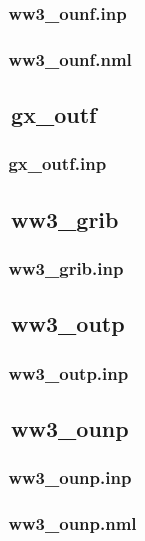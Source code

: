 \subsubsection{~ww3\_ounf.inp} \label{sec:config131}
\vsssub
\vsssub
\subsubsection{~ww3\_ounf.nml} \label{sec:config132}
\vsssub
\vssub


\vssub
\subsection{~gx\_outf}
\vsssub
\subsubsection{~gx\_outf.inp} \label{sec:config141}
\vsssub
\vssub


\vssub
\subsection{~ww3\_grib}
\vsssub
\subsubsection{~ww3\_grib.inp} \label{sec:config151}
\vsssub
\vssub



\vssub
\subsection{~ww3\_outp}
\vsssub
\subsubsection{~ww3\_outp.inp} \label{sec:config161}
\vsssub
\vssub


\vssub
\subsection{~ww3\_ounp}
\vsssub
\subsubsection{~ww3\_ounp.inp} \label{sec:config171}
\vsssub
\vsssub
\subsubsection{~ww3\_ounp.nml} \label{sec:config172}
\vsssub
\vssub


